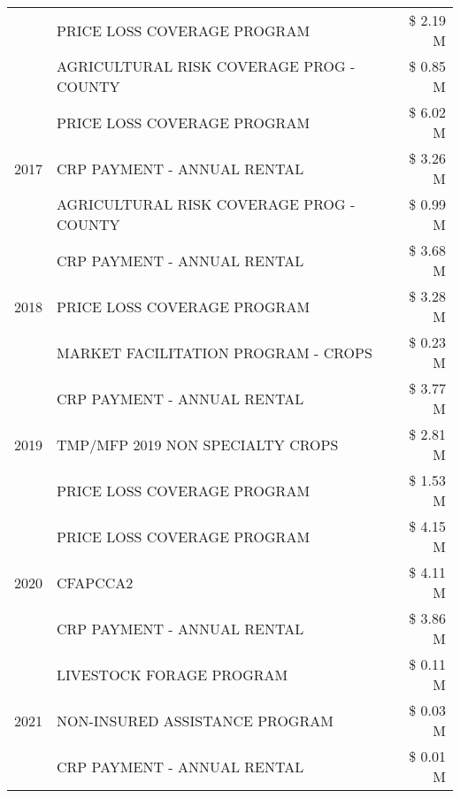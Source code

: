 \begin{tabular}{llr}
 & PRICE LOSS COVERAGE PROGRAM & \$ 2.19 M \\
 & AGRICULTURAL RISK COVERAGE PROG - COUNTY & \$ 0.85 M \\
\cline{1-3}
\multirow[t]{3}{*}{2017} & PRICE LOSS COVERAGE PROGRAM & \$ 6.02 M \\
 & CRP PAYMENT - ANNUAL RENTAL & \$ 3.26 M \\
 & AGRICULTURAL RISK COVERAGE PROG - COUNTY & \$ 0.99 M \\
\cline{1-3}
\multirow[t]{3}{*}{2018} & CRP PAYMENT - ANNUAL RENTAL & \$ 3.68 M \\
 & PRICE LOSS COVERAGE PROGRAM & \$ 3.28 M \\
 & MARKET FACILITATION PROGRAM - CROPS & \$ 0.23 M \\
\cline{1-3}
\multirow[t]{3}{*}{2019} & CRP PAYMENT - ANNUAL RENTAL & \$ 3.77 M \\
 & TMP/MFP 2019 NON SPECIALTY CROPS & \$ 2.81 M \\
 & PRICE LOSS COVERAGE PROGRAM & \$ 1.53 M \\
\cline{1-3}
\multirow[t]{3}{*}{2020} & PRICE LOSS COVERAGE PROGRAM & \$ 4.15 M \\
 & CFAPCCA2 & \$ 4.11 M \\
 & CRP PAYMENT - ANNUAL RENTAL & \$ 3.86 M \\
\cline{1-3}
\multirow[t]{3}{*}{2021} & LIVESTOCK FORAGE PROGRAM & \$ 0.11 M \\
 & NON-INSURED ASSISTANCE PROGRAM & \$ 0.03 M \\
 & CRP PAYMENT - ANNUAL RENTAL & \$ 0.01 M \\
\cline{1-3}
\bottomrule
\end{tabular}
